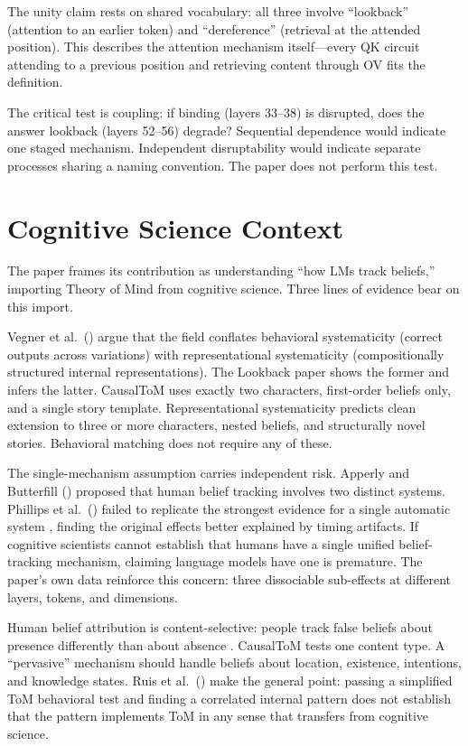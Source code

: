 \documentclass[11pt]{article}
\begin{document}
The unity claim rests on shared vocabulary: all three involve ``lookback'' (attention to an earlier token) and ``dereference'' (retrieval at the attended position). This describes the attention mechanism itself---every QK circuit attending to a previous position and retrieving content through OV fits the definition.

The critical test is coupling: if binding (layers 33--38) is disrupted, does the answer lookback (layers 52--56) degrade? Sequential dependence would indicate one staged mechanism. Independent disruptability would indicate separate processes sharing a naming convention. The paper does not perform this test.


\section{Cognitive Science Context}
\label{sec:cogsci}

The paper frames its contribution as understanding ``how LMs track beliefs,'' importing Theory of Mind from cognitive science. Three lines of evidence bear on this import.

Vegner et al.\ (\citeyear{vegner2025systematicity}) argue that the field conflates behavioral systematicity (correct outputs across variations) with representational systematicity (compositionally structured internal representations). The Lookback paper shows the former and infers the latter. CausalToM uses exactly two characters, first-order beliefs only, and a single story template. Representational systematicity predicts clean extension to three or more characters, nested beliefs, and structurally novel stories. Behavioral matching does not require any of these.

The single-mechanism assumption carries independent risk. Apperly and Butterfill (\citeyear{apperly2009humans}) proposed that human belief tracking involves two distinct systems. Phillips et al.\ (\citeyear{phillips2015second}) failed to replicate the strongest evidence for a single automatic system \citep{kovacs2010social}, finding the original effects better explained by timing artifacts. If cognitive scientists cannot establish that humans have a single unified belief-tracking mechanism, claiming language models have one is premature. The paper's own data reinforce this concern: three dissociable sub-effects at different layers, tokens, and dimensions.

Human belief attribution is content-selective: people track false beliefs about presence differently than about absence \citep{schuwerk2015implicit}. CausalToM tests one content type. A ``pervasive'' mechanism should handle beliefs about location, existence, intentions, and knowledge states. Ruis et al.\ (\citeyear{ruis2025reevaluating}) make the general point: passing a simplified ToM behavioral test and finding a correlated internal pattern does not establish that the pattern implements ToM in any sense that transfers from cognitive science.
\end{document}
